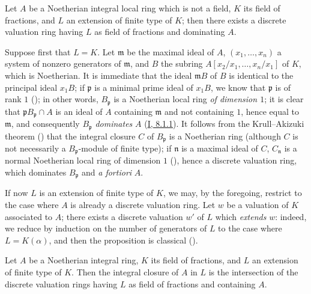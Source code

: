 \begin{proposition}[7.1.7]
\label{II.7.1.7}
Let $A$ be a Noetherian integral local ring which is not a field, $K$ its
field of fractions, and $L$ an extension of finite type of $K$; then there
exists a discrete valuation ring having $L$ as field of fractions and
dominating $A$.
\end{proposition}

Suppose first that $L=K$. Let $\mathfrak{m}$ be the maximal ideal of $A$,
$(x_1,\ldots,x_n)$ a system of nonzero generators of $\mathfrak{m}$,
and $B$ the subring
$A[x_2/x_1,\ldots,x_n/x_1]$ of $K$, which is Noetherian. It is immediate that
the ideal $\mathfrak{m}B$ of $B$ is identical to the principal ideal $x_1B$;
if $\mathfrak{p}$ is a minimal prime ideal of $x_1B$, we know that
$\mathfrak{p}$ is of rank $1$ (\cite[t.~I, p.~277]{I-13}); in other words,
$B_{\mathfrak{p}}$ is a Noetherian local ring \emph{of dimension $1$};
it is clear that
$\mathfrak{p}B_{\mathfrak{p}}\cap A$ is an ideal of $A$ containing
$\mathfrak{m}$ and not containing $1$, hence equal to $\mathfrak{m}$, and
consequently $B_{\mathfrak{p}}$ \emph{dominates} $A$
(\hyperref[I.8.1.1]{I, 8.1.1}). It follows from the Krull--Akizuki theorem
(\cite[p.~293]{II-25}) that the integral closure $C$ of $B_{\mathfrak{p}}$
is a Noetherian ring (although $C$ is not necessarily a
$B_{\mathfrak{p}}$-module of finite type); if $\mathfrak{n}$ is a maximal
ideal of $C$, $C_{\mathfrak{n}}$ is a normal Noetherian local ring of
dimension $1$ (\cite[p.~295]{II-25}), hence a discrete valuation ring,
which dominates $B_{\mathfrak{p}}$ and \emph{a fortiori} $A$.

If now $L$ is an extension of finite type of $K$, we may, by the
foregoing, restrict to the case where $A$ is already a discrete
valuation ring. Let $w$ be a valuation of $K$ associated to $A$; there exists a
discrete valuation $w'$ of $L$ which \emph{extends} $w$: indeed, we reduce
by induction on the number of generators of $L$ to the case where
$L=K(\alpha)$, and then the proposition is classical
(\cite[p.~106]{II-24}).

\begin{corollary}[7.1.8]
\label{II.7.1.8}
Let $A$ be a Noetherian integral ring, $K$ its field of fractions, and $L$ an
extension of finite type of $K$. Then the integral closure of $A$ in $L$
is the intersection of the discrete valuation rings having $L$ as field of
fractions and containing $A$.
\end{corollary}

